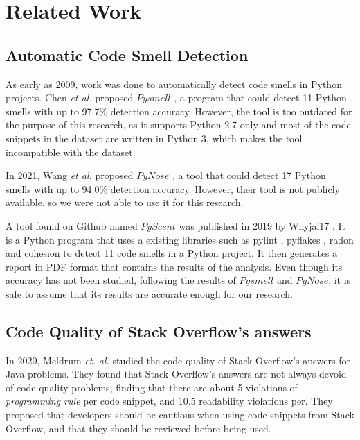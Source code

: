 
\section{Related Work}
\label{sec:related-work}
\subsection{Automatic Code Smell Detection}
\label{sec:related-work-automatic-code-smell-detection}
As early as 2009, work was done to automatically detect code smells in Python projects. Chen \textit{et al.} proposed $Pysmell$ \cite{pysmell}, a program that could detect 11 Python smells with up to 97.7\% detection accuracy. However, the tool is too outdated for the purpose of this research, as it supports Python 2.7 only and most of the code snippets in the dataset are written in Python 3, which makes the tool incompatible with the dataset.

In 2021, Wang \textit{et al.} proposed $PyNose$ \cite{pynose}, a tool that could detect 17 Python smells with up to 94.0\% detection accuracy. However, their tool is not publicly available, so we were not able to use it for this research.

A tool found on Github named $PyScent$ was published in 2019 by Whyjai17 \cite{pyscent}. It is a Python program that uses a existing libraries such as pylint \cite{pylint}, pyflakes \cite{pyflake}, radon \cite{radon} and cohesion \cite{cohesion} to detect 11 code smells in a Python project. It then generates a report in PDF format that contains the results of the analysis. Even though its accuracy has not been studied, following the results of $Pysmell$ and $PyNose$, it is safe to assume that its results are accurate enough for our research.

\subsection{Code Quality of Stack Overflow's answers}
\label{sec:related-work-code-quality-of-stack-overflow-answers}
In 2020, Meldrum \textit{et. al.} \cite{meldrum-2020} studied the code quality of Stack Overflow's answers for Java problems. They found that Stack Overflow's answers are not always devoid of code quality problems, finding that there are about 5 violations of \textit{programming rule} per code snippet, and 10.5 readability violations per. They proposed that developers should be cautious when using code snippets from Stack Overflow, and that they should be reviewed before being used.

